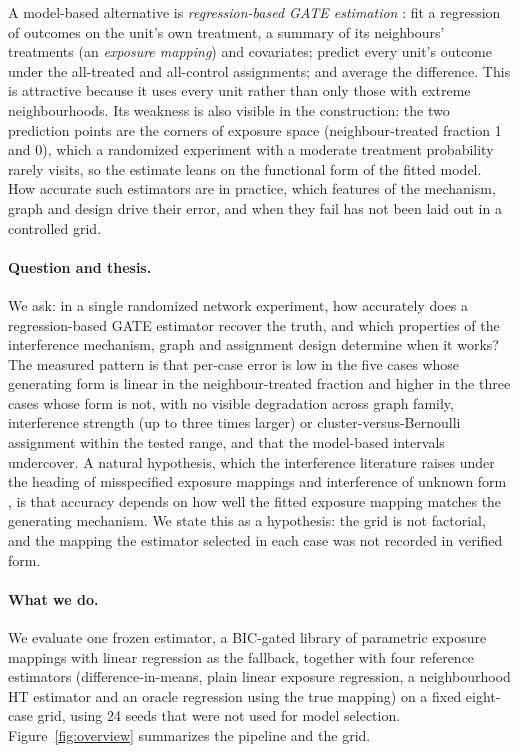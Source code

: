 \documentclass{article}
\begin{document}
A model-based alternative is \emph{regression-based GATE estimation} \citep{Chin2018RegressionAF}: fit a regression of outcomes on the unit's own treatment, a summary of its neighbours' treatments (an \emph{exposure mapping}) and covariates; predict every unit's outcome under the all-treated and all-control assignments; and average the difference. This is attractive because it uses every unit rather than only those with extreme neighbourhoods. Its weakness is also visible in the construction: the two prediction points are the corners of exposure space (neighbour-treated fraction 1 and 0), which a randomized experiment with a moderate treatment probability rarely visits, so the estimate leans on the functional form of the fitted model. How accurate such estimators are in practice, which features of the mechanism, graph and design drive their error, and when they fail has not been laid out in a controlled grid.

\paragraph{Question and thesis.} We ask: in a single randomized network experiment, how accurately does a regression-based GATE estimator recover the truth, and which properties of the interference mechanism, graph and assignment design determine when it works? The measured pattern is that per-case error is low in the five cases whose generating form is linear in the neighbour-treated fraction and higher in the three cases whose form is not, with no visible degradation across graph family, interference strength (up to three times larger) or cluster-versus-Bernoulli assignment within the tested range, and that the model-based intervals undercover. A natural hypothesis, which the interference literature raises under the heading of misspecified exposure mappings and interference of unknown form \citep{Savje2023Misspecified,Savje2021Unknown}, is that accuracy depends on how well the fitted exposure mapping matches the generating mechanism. We state this as a hypothesis: the grid is not factorial, and the mapping the estimator selected in each case was not recorded in verified form.

\paragraph{What we do.} We evaluate one frozen estimator, a BIC-gated library of parametric exposure mappings with linear regression as the fallback, together with four reference estimators (difference-in-means, plain linear exposure regression, a neighbourhood HT estimator and an oracle regression using the true mapping) on a fixed eight-case grid, using 24 seeds that were not used for model selection. Figure~\ref{fig:overview} summarizes the pipeline and the grid.
\end{document}
